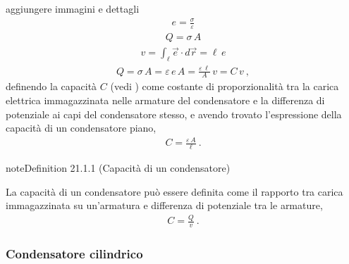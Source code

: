\documentclass[letterpaper,10pt,italian]{jupyterBook}
\begin{document}
\sphinxAtStartPar
{} aggiungere immagini e dettagli
\begin{equation*}
\begin{split}e = \frac{\sigma}{\varepsilon}\end{split}
\end{equation*}\begin{equation*}
\begin{split}Q = \sigma \, A\end{split}
\end{equation*}\begin{equation*}
\begin{split}v = \int_{\ell} \vec{e} \cdot d \vec{r} = \ell \, e\end{split}
\end{equation*}\begin{equation*}
\begin{split} Q = \sigma \, A = \varepsilon \, e \, A = \frac{\varepsilon \, \ell}{A} \, v = C \, v \ ,\end{split}
\end{equation*}
\sphinxAtStartPar
definendo la capacità \(C\) (vedi {\hyperref[\detokenize{ch/electromagnetism/electrostatics:capacitor-capacity}]{}}) come costante di proporzionalità tra la carica elettrica immagazzinata nelle armature del condensatore e la differenza di potenziale ai capi del condensatore stesso, e avendo trovato l’espressione della capacità di un condensatore piano,
\begin{equation*}
\begin{split}C = \frac{\varepsilon \, A}{\ell} \ .\end{split}
\end{equation*}\label{ch/electromagnetism/electrostatics:capacitor-capacity}
\begin{sphinxadmonition}{note}{Definition 21.1.1 (Capacità di un condensatore)}



\sphinxAtStartPar
La capacità di un condensatore può essere definita come il rapporto tra carica immagazzinata su un’armatura e differenza di potenziale tra le armature,
\begin{equation*}
\begin{split}C = \frac{Q}{v} \ .\end{split}
\end{equation*}\end{sphinxadmonition}
\subsubsection*{Condensatore cilindrico}
\end{document}
